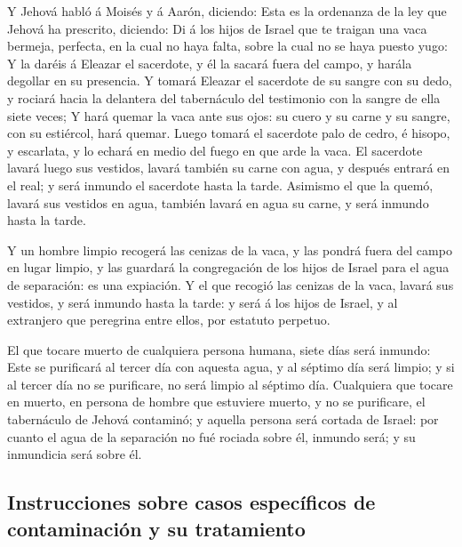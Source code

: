  Y Jehová habló á Moisés y á Aarón, diciendo:
 Esta es la ordenanza de la ley que Jehová ha prescrito,
diciendo: Di á los hijos de Israel que te traigan una vaca bermeja,
perfecta, en la cual no haya falta, sobre la cual no se haya puesto
yugo:  Y la daréis á Eleazar el sacerdote, y él la sacará
fuera del campo, y harála degollar en su presencia.  Y
tomará Eleazar el sacerdote de su sangre con su dedo, y rociará hacia la
delantera del tabernáculo del testimonio con la sangre de ella siete
veces;  Y hará quemar la vaca ante sus ojos: su cuero y su
carne y su sangre, con su estiércol, hará quemar.  Luego
tomará el sacerdote palo de cedro, é hisopo, y escarlata, y lo echará en
medio del fuego en que arde la vaca.  El sacerdote lavará
luego sus vestidos, lavará también su carne con agua, y después entrará
en el real; y será inmundo el sacerdote hasta la tarde. 
Asimismo el que la quemó, lavará sus vestidos en agua, también lavará en
agua su carne, y será inmundo hasta la tarde.

 Y un hombre limpio recogerá las cenizas de la vaca, y las
pondrá fuera del campo en lugar limpio, y las guardará la congregación
de los hijos de Israel para el agua de separación: es una expiación.
 Y el que recogió las cenizas de la vaca, lavará sus
vestidos, y será inmundo hasta la tarde: y será á los hijos de Israel, y
al extranjero que peregrina entre ellos, por estatuto perpetuo.

 El que tocare muerto de cualquiera persona humana, siete
días será inmundo:  Este se purificará al tercer día con
aquesta agua, y al séptimo día será limpio; y si al tercer día no se
purificare, no será limpio al séptimo día.  Cualquiera
que tocare en muerto, en persona de hombre que estuviere muerto, y no se
purificare, el tabernáculo de Jehová contaminó; y aquella persona será
cortada de Israel: por cuanto el agua de la separación no fué rociada
sobre él, inmundo será; y su inmundicia será sobre él.

\hypertarget{instrucciones-sobre-casos-especuxedficos-de-contaminaciuxf3n-y-su-tratamiento}{%
\subsection{Instrucciones sobre casos específicos de contaminación y su
tratamiento}\label{instrucciones-sobre-casos-especuxedficos-de-contaminaciuxf3n-y-su-tratamiento}}

